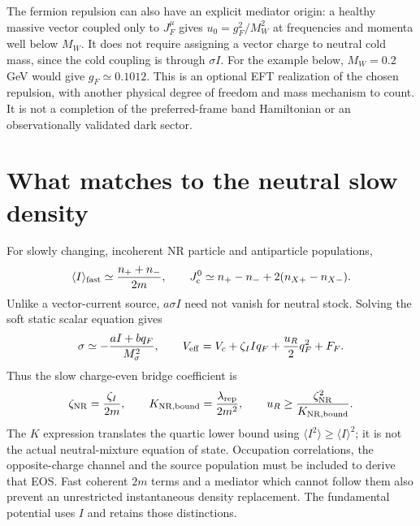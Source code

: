 \documentclass[11pt]{article}
\begin{document}
The fermion repulsion can also have an explicit mediator origin: a healthy
massive vector coupled only to $J_F^\mu$ gives $u_0=g_F^2/M_W^2$ at
frequencies and momenta well below $M_W$. It does not require assigning a
vector charge to neutral cold mass, since the cold coupling is through
$\sigma I$. For the example below, $M_W=0.2$ GeV would give
$g_F\simeq0.1012$. This is an optional EFT realization of the chosen
repulsion, with another physical degree of freedom and mass mechanism to
count. It is not a completion of the preferred-frame band Hamiltonian or
an observationally validated dark sector.

\section{What matches to the neutral slow density}
For slowly changing, incoherent NR particle and antiparticle populations,
\begin{equation}
 \langle I\rangle_{\rm fast}\simeq {n_++n_-\over2m},
 \qquad J_c^0\simeq n_+-n_-+2(n_{X+}-n_{X-}).
\end{equation}
Unlike a vector-current source, $a\sigma I$ need not vanish for neutral
stock. Solving the soft static scalar equation gives
\begin{equation}
 \sigma\simeq-{aI+bq_F\over M_\sigma^2},\qquad
 V_{\rm eff}=V_c+\zeta_I Iq_F+{u_R\over2}q_F^2+F_F.
\end{equation}
Thus the slow charge-even bridge coefficient is
\begin{equation}
 \zeta_{\rm NR}={\zeta_I\over2m},\qquad
 K_{\rm NR,bound}={\lambda_{\rm rep}\over2m^2},\qquad
 u_R\geq{\zeta_{\rm NR}^2\over K_{\rm NR,bound}}.
\end{equation}
The $K$ expression translates the quartic lower bound using
$\langle I^2\rangle\geq\langle I\rangle^2$; it is not the actual
neutral-mixture equation of state. Occupation correlations, the opposite-charge
channel and the source population must be included to derive that EOS.
Fast coherent $2m$ terms and a mediator which cannot follow them also
prevent an unrestricted instantaneous density replacement. The fundamental
potential uses $I$ and retains those distinctions.
\end{document}
